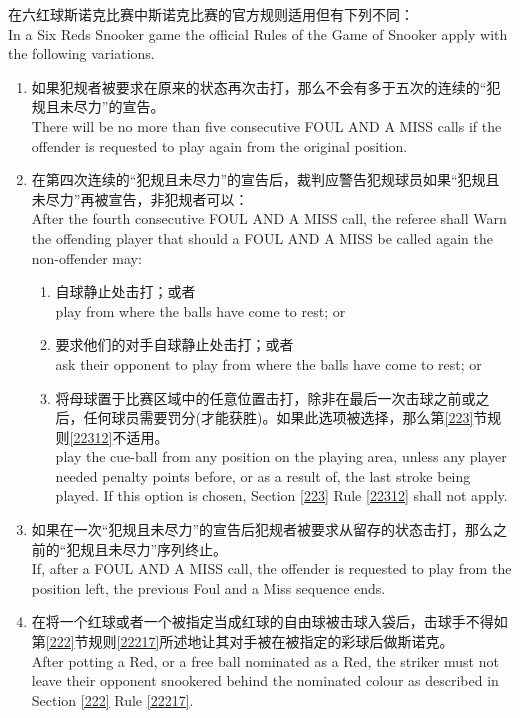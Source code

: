 \noindent 在六红球斯诺克比赛中斯诺克比赛的官方规则适用但有下列不同：\\
In a Six Reds Snooker game the official Rules of the Game of 
Snooker apply with the following variations.
\begin{enumerate}[label=(\alph*)]
    \item 如果犯规者被要求在原来的状态再次击打，那么不会有多于五次的连续的``犯规且未尽力''的宣告。\\
    There will be no more than five consecutive FOUL AND A MISS calls if the offender is requested to play again from the original position.
    \item 在第四次连续的``犯规且未尽力''的宣告后，裁判应警告犯规球员如果``犯规且未尽力''再被宣告，非犯规者可以：\\
    After the fourth consecutive FOUL AND A MISS call, the referee shall Warn the offending player that should a FOUL AND A MISS be called again the non-offender may:
    \begin{enumerate}[label=(\roman*)]
        \item 自球静止处击打；或者\\
        play from where the balls have come to rest; or
        \item 要求他们的对手自球静止处击打；或者\\
        ask their opponent to play from where the balls have come to rest; or
        \item 将母球置于比赛区域中的任意位置击打，除非在最后一次击球之前或之后，任何球员需要罚分(才能获胜)。如果此选项被选择，那么第\ref{223}节规则\ref{22312}不适用。\\
        play the cue-ball from any position on the playing area, unless any player needed penalty points before, or as a result of, the last stroke being played. If this option is chosen, Section \ref{223} Rule \ref{22312} shall not apply.
    \end{enumerate}
    \item 如果在一次``犯规且未尽力''的宣告后犯规者被要求从留存的状态击打，那么之前的``犯规且未尽力''序列终止。\\
    If, after a FOUL AND A MISS call, the offender is requested to play from the position left, the previous Foul and a Miss sequence ends.
    \item 在将一个红球或者一个被指定当成红球的自由球被击球入袋后，击球手不得如第\ref{222}节规则\ref{22217}所述地让其对手被在被指定的彩球后做斯诺克。\\
    After potting a Red, or a free ball nominated as a Red, the striker must not leave their opponent snookered behind the nominated colour as described in Section \ref{222} Rule \ref{22217}.
\end{enumerate}

